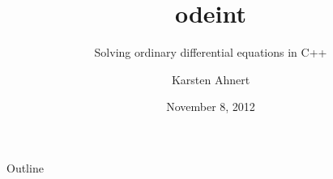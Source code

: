 \documentclass{beamer}
\title[odeint]{odeint}
\subtitle[odeint]{Solving ordinary differential equations in C++}
\author[Karsten Ahnert]{Karsten Ahnert}
\institute[Ambrosys GmbH]{Ambrosys -- Gesellschaft f\"ur Management komplexer Systeme, Potsdam}
\date{November 8, 2012}
\newcommand{\heading}[1]{\centerline{\Large #1} \vspace{0.5em}}
\begin{document}
\frame{
  \titlepage


}

\begin{frame}
  \heading{Outline}

  \tableofcontents
\end{frame}










%
\end{document}
